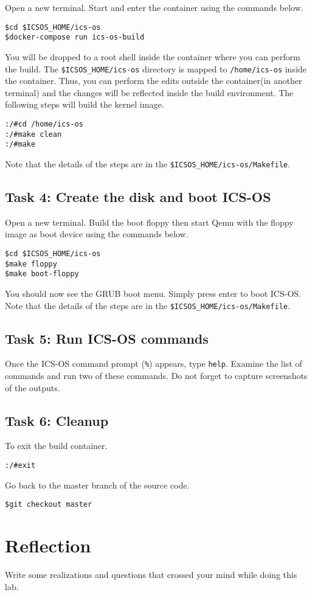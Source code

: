 \documentclass[a4paper, 11pt,oneside]{article}
\begin{document}
Open a new terminal. Start and enter the container using the commands below.

\begin{verbatim}
$cd $ICSOS_HOME/ics-os
$docker-compose run ics-os-build
\end{verbatim}

You will be dropped to a root shell inside the container where you can perform 
the build. The \texttt{\$ICSOS\_HOME/ics-os} directory is mapped to 
\texttt{/home/ics-os} inside the container. Thus, you can perform the edits 
outside the container(in another terminal) and the changes will be reflected 
inside the build environment. The following steps will build the kernel image. 

\begin{verbatim}
:/#cd /home/ics-os
:/#make clean
:/#make
\end{verbatim}

Note that the details of the steps are in the 
\texttt{\$ICSOS\_HOME/ics-os/Makefile}.

\subsection*{Task 4: Create the disk and boot ICS-OS}
Open a new terminal. Build the boot floppy then start Qemu with the floppy 
image as boot device using the commands below. 

\begin{verbatim}
$cd $ICSOS_HOME/ics-os
$make floppy
$make boot-floppy 
\end{verbatim}

You should now see the GRUB boot menu. Simply press enter to boot ICS-OS. Note 
that the details of the steps are in the \texttt{\$ICSOS\_HOME/ics-os/Makefile}.

\subsection*{Task 5: Run ICS-OS commands}
Once the ICS-OS command prompt (\texttt{\%}) appears, type \texttt{help}. 
Examine the list of commands and run two of these commands. Do not forget 
to capture screenshots of the outputs.

\subsection*{Task 6: Cleanup}
To exit the build container. 
\begin{verbatim}
:/#exit
\end{verbatim}

Go back to the master branch of the source code.
\begin{verbatim}
$git checkout master
\end{verbatim}

\section{Reflection}
Write some realizations and questions that crossed your mind while doing this 
lab. 
\end{document}
